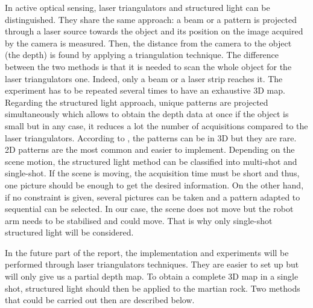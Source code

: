 In active optical sensing, laser triangulators and structured light can be distinguished. They share the same approach: a beam or a pattern is projected through a laser source towards the object and its position on the image acquired by the camera is measured. Then, the distance from the camera to the object (the depth) is found by applying a triangulation technique. The difference between the two methods is that it is needed to scan the whole object for the laser triangulators one. Indeed, only a beam or a laser strip reaches it. The experiment has to be repeated several times to have an exhaustive 3D map. Regarding the structured light approach, unique patterns are projected simultaneously which allows to obtain the depth data at once if the object is small but in any case, it reduces a lot the number of acquisitions compared to the laser triangulators. According to \cite{tuto}, the patterns can be in 3D but they are rare. 2D patterns are the most common and easier to implement. Depending on the scene motion, the structured light method can be classified into multi-shot and single-shot. If the scene is moving, the acquisition time must be short and thus, one picture should be enough to get the desired information. On the other hand, if no constraint is given, several pictures can be taken and a pattern adapted to sequential can be selected. In our case, the scene does not move but the robot arm needs to be stabilised and could move. That is why only single-shot structured light will be considered.

In the future part of the report, the implementation and experiments will be performed through laser triangulators techniques. They are easier to set up but will only give us a partial depth map. To obtain a complete 3D map in a single shot, structured light should then be applied to the martian rock. Two methods that could be carried out then are described below. 